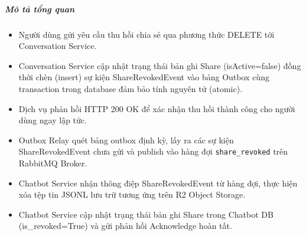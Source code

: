 \subparagraph{Mô tả tổng quan}

\begin{itemize}
\item Người dùng gửi yêu cầu thu hồi chia sẻ qua phương thức DELETE tới Conversation Service.
\item Conversation Service cập nhật trạng thái bản ghi Share (isActive=false) đồng thời chèn (insert) sự kiện ShareRevokedEvent vào bảng Outbox cùng transaction trong database đảm bảo tính nguyên tử (atomic).
\item Dịch vụ phản hồi HTTP 200 OK để xác nhận thu hồi thành công cho người dùng ngay lập tức.
\item Outbox Relay quét bảng outbox định kỳ, lấy ra các sự kiện ShareRevokedEvent chưa gửi và publish vào hàng đợi \texttt{share\_revoked} trên RabbitMQ Broker.
\item Chatbot Service nhận thông điệp ShareRevokedEvent từ hàng đợi, thực hiện xóa tệp tin JSONL lưu trữ tương ứng trên R2 Object Storage.
\item Chatbot Service cập nhật trạng thái bản ghi Share trong Chatbot DB (is_revoked=True) và gửi phản hồi Acknowledge hoàn tất.
\end{itemize}
